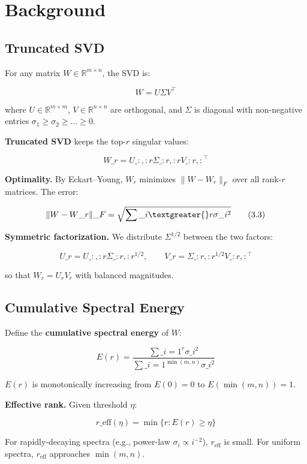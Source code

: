 
\section{Background}

\subsection{Truncated SVD}

For any matrix $W \in \mathbb{R}^{m \times n}$, the SVD is:

\[
W = U \Sigma V^\top
\tag{3.1}
\]

where $U \in \mathbb{R}^{m \times m}$, $V \in \mathbb{R}^{n \times n}$ are 
orthogonal, and $\Sigma$ is diagonal with non-negative entries 
$\sigma_1 \geq \sigma_2 \geq \dots \geq 0$.

\textbf{Truncated SVD} keeps the top-$r$ singular values:

\[
W\_r = U\_{:, :r} \Sigma\_{:r, :r} V\_{:r, :}^\top
\tag{3.2}
\]

\textbf{Optimality.} By Eckart--Young, $W_r$ minimizes $\|W - W_r\|_F$ over all 
rank-$r$ matrices. The error:

\[
\|W - W\_r\|\_F = \sqrt{\sum\_{i \textgreater{} r} \sigma\_i^2}
\tag{3.3}
\]

\textbf{Symmetric factorization.} We distribute $\Sigma^{1/2}$ between the two 
factors:

\[
U\_r = U\_{:, :r} \Sigma\_{:r, :r}^{1/2}, \qquad
V\_r = \Sigma\_{:r, :r}^{1/2} V\_{:r, :}^\top
\tag{3.4}
\]

so that $W_r = U_r V_r$ with balanced magnitudes.

\subsection{Cumulative Spectral Energy}

Define the \textbf{cumulative spectral energy} of $W$:

\[
E(r) = \frac{\sum\_{i=1}^{r} \sigma\_i^2}{\sum\_{i=1}^{\min(m, n)} \sigma\_i^2}
\tag{3.5}
\]

$E(r)$ is monotonically increasing from $E(0) = 0$ to $E(\min(m, n)) = 1$.

\textbf{Effective rank.} Given threshold $\eta$:

\[
r\_\text{eff}(\eta) = \min\{r : E(r) \geq \eta\}
\tag{3.6}
\]

For rapidly-decaying spectra (e.g., power-law $\sigma_i \propto i^{-2}$), 
$r_\text{eff}$ is small. For uniform spectra, $r_\text{eff}$ approaches 
$\min(m, n)$.

